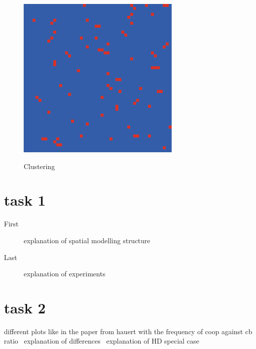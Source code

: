 \documentclass[DIV=calc, paper=a4, fontsize=11pt, twocolumn]{scrartcl}	 %
\begin{document}
\begin{figure}[here]
\centering
\begin{minipage}{.35\textwidth}
  \centering
  \includegraphics[width=1\linewidth]{HDspatial8cost01}
 \caption{}{Clustering}
\label{fig:PDspatialcluster}
\end{minipage}%
\end{figure}

\section*{task 1}


\begin{description}
\item[First] explanation of spatial modelling structure
\item[Last] explanation of experiments
\end{description}

\section*{task 2}
different plots like in the paper from hauert with the frequency of coop against cb ratio \
explanation of differences \
explanation of HD special case
\end{document}
